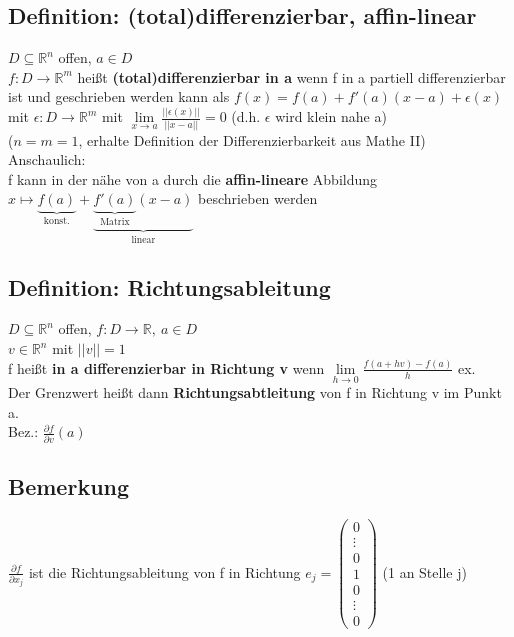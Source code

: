 \subsection{Definition: (total)differenzierbar, affin-linear}
$D\subseteq \mathbb{R}^n$ offen, $a\in D$\\
$f:D\rightarrow \mathbb{R}^m$ heißt \textbf{(total)differenzierbar in a} wenn f in a partiell differenzierbar ist und geschrieben werden kann als $f(x)=f(a)+f'(a)(x-a)+\epsilon(x)$ mit $\epsilon: D\rightarrow \mathbb{R}^m$ mit $\lim\limits_{x\rightarrow a} \frac{||\epsilon(x)||}{||x-a||}=0$ (d.h. $\epsilon$ wird klein nahe a)\\
($n=m=1$, erhalte Definition der Differenzierbarkeit aus Mathe II)\\
Anschaulich:\\
f kann in der nähe von a durch die \textbf{affin-lineare} Abbildung $x\mapsto \underbrace{f(a)}_{\text{konst.}}+\underbrace{\underbrace{f'(a)}_{\text{Matrix}}(x-a)}_{\text{linear}}$ beschrieben werden

\subsection{Definition: Richtungsableitung}
$D\subseteq \mathbb{R}^n$ offen, $f:D\rightarrow \mathbb{R}, \ a\in D$\\
$v\in \mathbb{R}^n$ mit $||v||=1$\\
f heißt \textbf{in a differenzierbar in Richtung v} wenn $\lim\limits_{h\rightarrow 0} \frac{f(a+hv)-f(a)}{h}$ ex.\\
Der Grenzwert heißt dann \textbf{Richtungsabtleitung} von f in Richtung v im Punkt a.\\
Bez.: $\frac{\partial f}{\partial v}(a)$

\subsection{Bemerkung}
$\frac{\partial f}{\partial x_j}$ ist die Richtungsableitung von f in Richtung $e_j=\begin{pmatrix}0 \\ \vdots \\ 0 \\ 1 \\ 0 \\ \vdots \\ 0\end{pmatrix}$ (1 an Stelle j)

